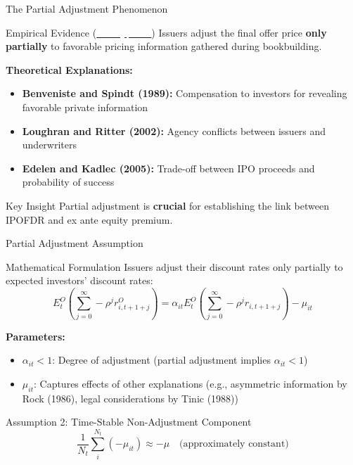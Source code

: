 \documentclass{beamer}
\begin{document}
\begin{frame}{The Partial Adjustment Phenomenon}
\begin{alertblock}{Empirical Evidence (\href{https://www.sciencedirect.com/science/article/pii/0304405X93900198}{\textcolor{white}{Hanley, 1993}})}
Issuers adjust the final offer price \textbf{only partially} to favorable pricing information gathered during bookbuilding.
\end{alertblock}

\textbf{Theoretical Explanations:}
\begin{itemize}
    \item \textbf{Benveniste and Spindt (1989):} Compensation to investors for revealing favorable private information
    \item \textbf{Loughran and Ritter (2002):} Agency conflicts between issuers and underwriters
    \item \textbf{Edelen and Kadlec (2005):} Trade-off between IPO proceeds and probability of success
\end{itemize}

\begin{alertblock}{Key Insight}
Partial adjustment is \textbf{crucial} for establishing the link between IPOFDR and ex ante equity premium.
\end{alertblock}
\end{frame}

\begin{frame}[allowframebreaks]{Partial Adjustment Assumption}
\begin{block}{Mathematical Formulation}
Issuers adjust their discount rates only partially to expected investors' discount rates:
\[
E_t^O\left(\sum_{j=0}^{\infty}-\rho^j r_{i,t+1+j}^O\right) = \alpha_{it}E_t^O\left(\sum_{j=0}^{\infty}-\rho^j r_{i,t+1+j}\right) - \mu_{it}
\]
\end{block}

\textbf{Parameters:}
\begin{itemize}
    \item $\alpha_{it} < 1$: Degree of adjustment (partial adjustment implies $\alpha_{it} < 1$)
    \item $\mu_{it}$: Captures effects of other explanations (e.g., asymmetric information by Rock (1986), legal considerations by Tinic (1988))
\end{itemize}

\framebreak
\begin{block}{Assumption 2: Time-Stable Non-Adjustment Component}
\[
\frac{1}{N_t}\sum_{i}^{N_t}(-\mu_{it}) \approx -\mu \quad \text{(approximately constant)}
\]
\end{block}
\end{frame}
\end{document}
